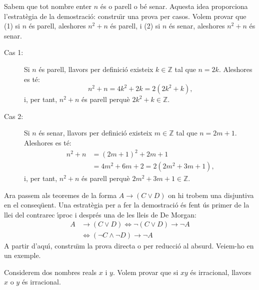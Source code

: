 \begin{solucio}
Sabem que tot nombre enter $n$ \'{e}s o parell o b\'{e} senar. Aquesta idea
proporciona l'estrat\`{e}gia de la demostraci\'{o}: constru\"{\i}r una prova
per casos. Volem provar que (1) si $n$ \'{e}s parell, aleshores $n^{2}+n$
\'{e}s parell, i (2) si $n$ \'{e}s senar, aleshores $n^{2}+n$ \'{e}s senar.

\begin{description}
\item[Cas 1:] Si $n$ \'{e}s parell, llavors per definici\'{o} existeix $k\in%
\mathbb{Z}$ tal que $n=2k$. Aleshores es t\'{e}:
\begin{equation*}
n^{2}+n=4k^{2}+2k=2\left( 2k^{2}+k\right) \text{,}
\end{equation*}
i, per tant, $n^{2}+n$ \'{e}s parell perqu\`{e} $2k^{2}+k\in\mathbb{Z}$.

\item[Cas 2:] Si $n$ \'{e}s senar, llavors per definici\'{o} existeix $m\in%
\mathbb{Z}$ tal que $n=2m+1$. Aleshores es t\'{e}:%
\begin{align*}
n^{2}+n & =\left( 2m+1\right) ^{2}+2m+1 \\
& =4m^{2}+6m+2=2\left( 2m^{2}+3m+1\right) \text{,}
\end{align*}
i, per tant, $n^{2}+n$ \'{e}s parell perqu\`{e} $2m^{2}+3m+1\in\mathbb{Z}$.
\end{description}
\end{solucio}

\bigskip

Ara passem als teoremes de la forma $A\longrightarrow\left( C\vee D\right) $
on hi trobem una disjuntiva en el conseq\"{u}ent. Una estrat\`{e}gia per a
fer la demostraci\'{o} \'{e}s fent \'{u}s primer de la llei del contrarec%
\'{\i}proc i despr\'{e}s una de les lleis de De Morgan:
\begin{align*}
A & \longrightarrow\left( C\vee D\right) \Longleftrightarrow\lnot\left(
C\vee D\right) \longrightarrow\lnot A \\
& \Longleftrightarrow\left( \lnot C\wedge\lnot D\right) \longrightarrow
\lnot A
\end{align*}
A partir d'aqu\'{\i}, constru\"{\i}m la prova directa o per reducci\'{o} al
absurd. Veiem-ho en un exemple.

\begin{exer}
Considerem dos nombres reals $x$ i $y$. Volem provar que si $xy$ \'{e}s
irracional, llavors $x$ o $y$ \'{e}s irracional.
\end{exer}

